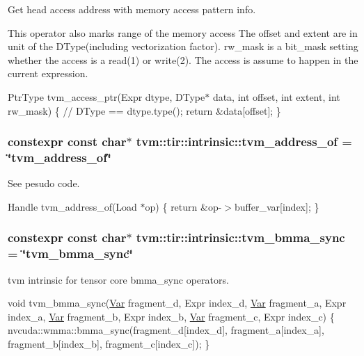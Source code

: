 Get head access address with memory access pattern info. 

This operator also marks range of the memory access The offset and extent are in unit of the D\+Type(including vectorization factor). rw\+\_\+mask is a bit\+\_\+mask setting whether the access is a read(1) or write(2). The access is assume to happen in the current expression.

Ptr\+Type tvm\+\_\+access\+\_\+ptr(Expr dtype, D\+Type$\ast$ data, int offset, int extent, int rw\+\_\+mask) \{ // D\+Type == dtype.\+type(); return \&data\mbox{[}offset\mbox{]}; \} 
\subsubsection[{\texorpdfstring{tvm\+\_\+address\+\_\+of}{tvm_address_of}}]{\setlength{\rightskip}{0pt plus 5cm}constexpr const char$\ast$ tvm\+::tir\+::intrinsic\+::tvm\+\_\+address\+\_\+of = \char`\"{}tvm\+\_\+address\+\_\+of\char`\"{}}\hypertarget{namespacetvm_1_1tir_1_1intrinsic_a58cdd60cdf71a2b97109804ae5c9c78a}{}\label{namespacetvm_1_1tir_1_1intrinsic_a58cdd60cdf71a2b97109804ae5c9c78a}


See pesudo code. 

Handle tvm\+\_\+address\+\_\+of(\+Load $\ast$op) \{ return \&op-\/$>$buffer\+\_\+var\mbox{[}index\mbox{]}; \} 
\subsubsection[{\texorpdfstring{tvm\+\_\+bmma\+\_\+sync}{tvm_bmma_sync}}]{\setlength{\rightskip}{0pt plus 5cm}constexpr const char$\ast$ tvm\+::tir\+::intrinsic\+::tvm\+\_\+bmma\+\_\+sync = \char`\"{}tvm\+\_\+bmma\+\_\+sync\char`\"{}}\hypertarget{namespacetvm_1_1tir_1_1intrinsic_a4d1287729e05d683af059be0faaf9014}{}\label{namespacetvm_1_1tir_1_1intrinsic_a4d1287729e05d683af059be0faaf9014}


tvm intrinsic for tensor core bmma\+\_\+sync operators. 

void tvm\+\_\+bmma\+\_\+sync(\hyperlink{classtvm_1_1tir_1_1Var}{Var} fragment\+\_\+d, Expr index\+\_\+d, \hyperlink{classtvm_1_1tir_1_1Var}{Var} fragment\+\_\+a, Expr index\+\_\+a, \hyperlink{classtvm_1_1tir_1_1Var}{Var} fragment\+\_\+b, Expr index\+\_\+b, \hyperlink{classtvm_1_1tir_1_1Var}{Var} fragment\+\_\+c, Expr index\+\_\+c) \{ nvcuda\+::wmma\+::bmma\+\_\+sync(fragment\+\_\+d\mbox{[}index\+\_\+d\mbox{]}, fragment\+\_\+a\mbox{[}index\+\_\+a\mbox{]}, fragment\+\_\+b\mbox{[}index\+\_\+b\mbox{]}, fragment\+\_\+c\mbox{[}index\+\_\+c\mbox{]}); \} 
